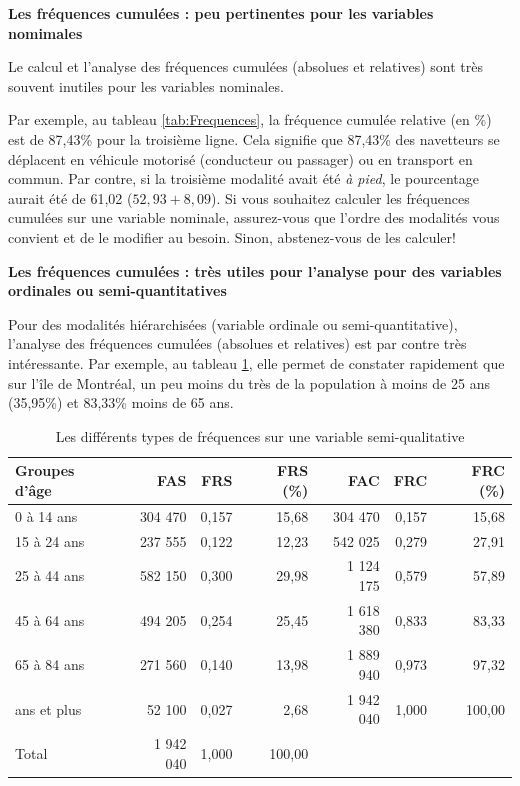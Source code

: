 \documentclass[
  11pt,
  french,
]{book}
\makeatletter
\newenvironment{kframev}{%
\medskip{}
\setlength{\fboxsep}{.8em}
 \def\at@end@of@kframev{}%
 \ifinner\ifhmode%
  \def\at@end@of@kframev{\end{minipage}}%
  \begin{minipage}{\columnwidth}%
 \fi\fi%
 \def\FrameCommand##1{\hskip\@totalleftmargin \hskip-\fboxsep
 \colorbox{shadebluecolor}{##1}\hskip-\fboxsep
     \hskip-\linewidth \hskip-\@totalleftmargin \hskip\columnwidth}%
 \MakeFramed {\advance\hsize-\width
   \@totalleftmargin\z@ \linewidth\hsize
   \@setminipage}}%
 {\par\unskip\endMakeFramed%
 \at@end@of@kframev}
\newenvironment{rmdblock}[1]
  {
  \begin{itemize}
  \renewcommand{\labelitemi}{
    \raisebox{-.7\height}[0pt][0pt]{
      {\setkeys{Gin}{width=3em,keepaspectratio}\texttt{[image: images/\#1]}}
    }
  }
  \setlength{\fboxsep}{1em}
  \begin{kframev}
  \small
  \item
  }
  {
  \end{kframev}
  \end{itemize}
  }
\newenvironment{bloc_attention}
  {\begin{rmdblock}{attention}}
  {\end{rmdblock}}
\makeatother
\begin{document}
\begin{bloc_attention}

\textbf{Les fréquences cumulées : peu pertinentes pour les variables nomimales}

Le calcul et l'analyse des fréquences cumulées (absolues et relatives) sont très souvent inutiles pour les variables nominales.

Par exemple, au tableau \ref{tab:Frequences}, la fréquence cumulée relative (en \%) est de 87,43\% pour la troisième ligne. Cela signifie que 87,43\% des navetteurs se déplacent en véhicule motorisé (conducteur ou passager) ou en transport en commun. Par contre, si la troisième modalité avait été \emph{à pied}, le pourcentage aurait été de 61,02 (\(52,93+8,09\)). Si vous souhaitez calculer les fréquences cumulées sur une variable nominale, assurez-vous que l'ordre des modalités vous convient et de le modifier au besoin. Sinon, abstenez-vous de les calculer!

\textbf{Les fréquences cumulées : très utiles pour l'analyse pour des variables ordinales ou semi-quantitatives}

Pour des modalités hiérarchisées (variable ordinale ou semi-quantitative), l'analyse des fréquences cumulées (absolues et relatives) est par contre très intéressante. Par exemple, au tableau \ref{tab:Frequences2}, elle permet de constater rapidement que sur l'île de Montréal, un peu moins du très de la population à moins de 25 ans (35,95\%) et 83,33\% moins de 65 ans.

\end{bloc_attention}

\begin{table}

\caption{\label{tab:Frequences2}Les différents types de fréquences sur une variable semi-qualitative}
\centering
\fontsize{8}{10}\selectfont
\begin{tabular}[t]{lrrrrrr}
\toprule
Groupes d'âge & FAS & FRS & FRS (\%) & FAC & FRC & FRC (\%)\\
\midrule
0 à 14 ans & 304 470 & 0,157 & 15,68 & 304 470 & 0,157 & 15,68\\
15 à 24 ans & 237 555 & 0,122 & 12,23 & 542 025 & 0,279 & 27,91\\
25 à 44 ans & 582 150 & 0,300 & 29,98 & 1 124 175 & 0,579 & 57,89\\
45 à 64 ans & 494 205 & 0,254 & 25,45 & 1 618 380 & 0,833 & 83,33\\
65 à 84 ans & 271 560 & 0,140 & 13,98 & 1 889 940 & 0,973 & 97,32\\
\addlinespace
85 ans et plus & 52 100 & 0,027 & 2,68 & 1 942 040 & 1,000 & 100,00\\
Total & 1 942 040 & 1,000 & 100,00 &  &  & \\
\bottomrule
\end{tabular}
\end{table}
\end{document}
